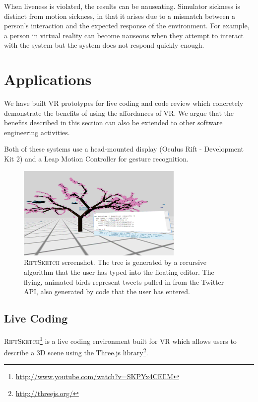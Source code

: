 \documentclass[conference]{IEEEtran}
\begin{document}
When liveness is violated, the results can be nauseating.
Simulator sickness is distinct from motion sickness, in that it arises due to a mismatch between a person's interaction and the expected response of the environment.
For example, a person in virtual reality can become nauseous when they attempt to interact with the system but the system does not respond quickly enough.





\section{Applications}

We have built VR prototypes for live coding and code review which concretely demonstrate the benefits of using the affordances of VR.
We argue that the benefits described in this section can also be extended to other software engineering activities. %

Both of these systems use a head-mounted display (Oculus Rift - Development Kit 2) and a Leap Motion Controller for gesture recognition.

\begin{figure}[ht!]
\centering
\includegraphics[width=80mm]{figures/riftsketch/unwarped_tree}
\caption{\textsc{RiftSketch} screenshot. The tree is generated by a recursive algorithm that the user has typed into the floating editor. The flying, animated birds represent tweets pulled in from the Twitter API, also generated by code that the user has entered. \label{fig:RiftSketch}}
\end{figure}

\subsection{Live Coding}

\textsc{RiftSketch}\footnote{\url{http://www.youtube.com/watch?v=SKPYx4CEIlM}} is a live coding environment built for VR which allows users to describe a 3D scene using the Three.js library\footnote{\url{http://threejs.org/}}.
\end{document}
